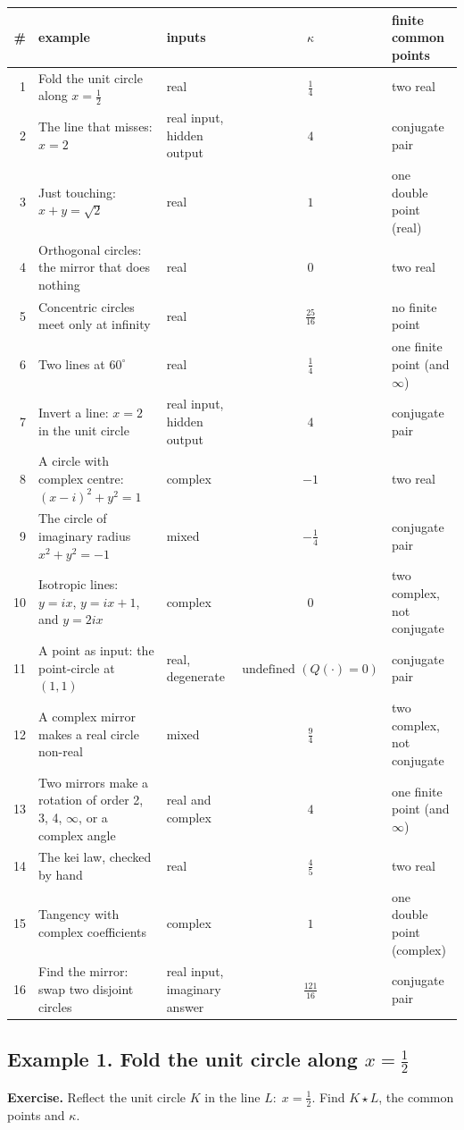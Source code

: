 \documentclass[10pt]{article}
\begin{document}
\smallskip
{\small\setlength{\tabcolsep}{4pt}\begin{longtable}{r>{\raggedright}p{}>{\raggedright}p{}c>{\raggedright\arraybackslash}p{}}\toprule
\# & example & inputs & $\kappa$ & finite common points\\\midrule\endhead
1 & Fold the unit circle along $x=\tfrac12$ & real & $\frac{1}{4}$ & two real\\
2 & The line that misses: $x=2$ & real input, hidden output & $4$ & conjugate pair\\
3 & Just touching: $x+y=\sqrt2$ & real & $1$ & one double point (real)\\
4 & Orthogonal circles: the mirror that does nothing & real & $0$ & two real\\
5 & Concentric circles meet only at infinity & real & $\frac{25}{16}$ & no finite point\\
6 & Two lines at $60^\circ$ & real & $\frac{1}{4}$ & one finite point (and $\infty$)\\
7 & Invert a line: $x=2$ in the unit circle & real input, hidden output & $4$ & conjugate pair\\
8 & A circle with complex centre: $(x-i)^2+y^2=1$ & complex & $-1$ & two real\\
9 & The circle of imaginary radius $x^2+y^2=-1$ & mixed & $- \frac{1}{4}$ & conjugate pair\\
10 & Isotropic lines: $y=ix$, $y=ix+1$, and $y=2ix$ & complex & $0$ & two complex, not conjugate\\
11 & A point as input: the point-circle at $(1,1)$ & real, degenerate & $\text{undefined } (Q(\cdot)=0)$ & conjugate pair\\
12 & A complex mirror makes a real circle non-real & mixed & $\frac{9}{4}$ & two complex, not conjugate\\
13 & Two mirrors make a rotation of order 2, 3, 4, $\infty$, or a complex angle & real and complex & $4$ & one finite point (and $\infty$)\\
14 & The kei law, checked by hand & real & $\frac{4}{5}$ & two real\\
15 & Tangency with complex coefficients & complex & $1$ & one double point (complex)\\
16 & Find the mirror: swap two disjoint circles & real input, imaginary answer & $\frac{121}{16}$ & conjugate pair\\
\bottomrule\end{longtable}}
\newpage
{}\subsection*{Example 1. Fold the unit circle along $x=\tfrac12$}
\textbf{Exercise.} Reflect the unit circle $K$ in the line $L:\;x=\tfrac12$. Find $K\star L$, the common points and $\kappa$.
\end{document}

